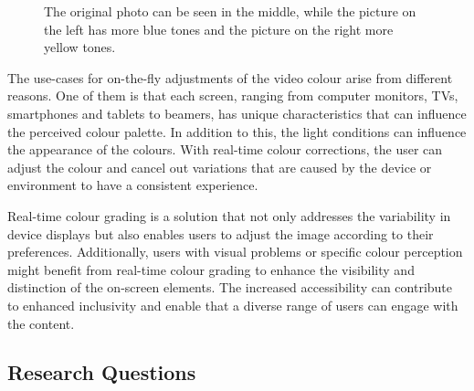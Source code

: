 \documentclass[../MasterThesis.tex]{subfiles}
\begin{document}
	
	\begin{figure}[H]
		\begin{center}
			\caption[Photo in three different colour tones (original, yellow, blue).]{The original photo can be seen in the middle, while the picture on the left has more blue tones and the picture on the right more yellow tones.}
			\label{figure:coloursblueandyellow}
		\end{center}
	\end{figure}
	The use-cases for on-the-fly adjustments of the video colour arise from different reasons. 
	One of them is that each screen, ranging from computer monitors, TVs, smartphones and tablets to beamers, has unique characteristics that can influence the perceived colour palette. 
	In addition to this, the light conditions can influence the appearance of the colours.
	With real-time colour corrections, the user can adjust the colour and cancel out variations that are caused by the device or environment to have a consistent experience.~\cite{screentype}
	
	Real-time colour grading is a solution that not only addresses the variability in device displays but also enables users to adjust the image according to their preferences.
	Additionally, users with visual problems or specific colour perception might benefit from real-time colour grading to enhance the visibility and distinction of the on-screen elements. 
	The increased accessibility can contribute to enhanced inclusivity and enable that a diverse range of users can engage with the content.~\cite{accessibility}
	
	
	

	
	
	
	
	
	
	
	
	
	
	
	\subsection{Research Questions} \label{subsection:researchquestions}
	
\end{document}
